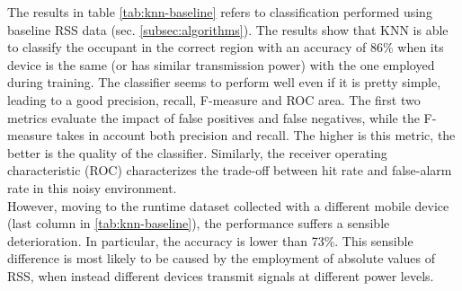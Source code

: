 The results in table \ref{tab:knn-baseline} refers to classification performed using baseline RSS data (sec. \ref{subsec:algorithms}). The results show that KNN is able to classify the occupant in the correct region with an accuracy of 86\% when its device is the same (or has similar transmission power) with the one employed during training. The classifier seems to perform well even if it is pretty simple, leading to a good precision, recall, F-measure and ROC area. The first two metrics evaluate the impact of false positives and false negatives, while the F-measure takes in account both precision and recall. The higher is this metric, the better is the quality of the classifier. Similarly, the receiver operating characteristic (ROC) characterizes the trade-off between hit rate and false-alarm rate in this noisy environment.\\
However, moving to the runtime dataset collected with a different mobile device (last column in \ref{tab:knn-baseline}), the performance suffers a sensible deterioration. In particular, the accuracy is lower than 73\%. This sensible difference is most likely to be caused by the employment of absolute values of RSS, when instead different devices transmit signals at different power levels.

